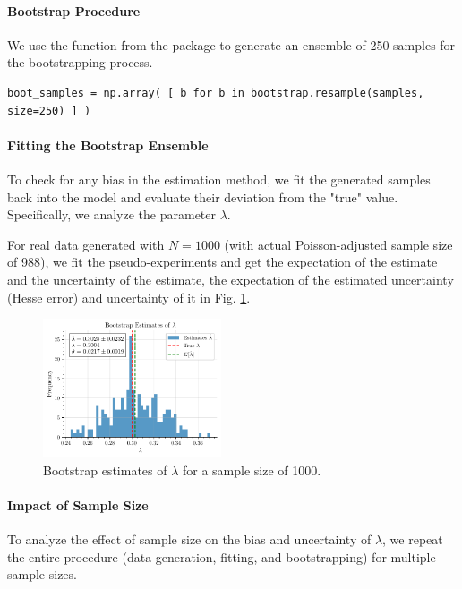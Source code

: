 \documentclass{article}
\begin{document}
\paragraph{Bootstrap Procedure}
We use the  function from the  package\cite{scikit-hep_resample} to generate an ensemble of 250 samples for the bootstrapping process.

\begin{lstlisting}[style=pythonstyle]
boot_samples = np.array( [ b for b in bootstrap.resample(samples, size=250) ] )
\end{lstlisting}

\paragraph{Fitting the Bootstrap Ensemble}
To check for any bias in the estimation method, we fit the generated samples back into the model and evaluate their deviation from the "true" value. Specifically, we analyze the parameter $\lambda$.

For real data generated with $N = 1000$ (with actual Poisson-adjusted sample size of 988), we fit the pseudo-experiments and get the expectation of the estimate and the uncertainty of the estimate, the expectation of the estimated uncertainty (Hesse error) and uncertainty of it in Fig. \ref{fig:samplingest_1000}. 

\begin{figure}[!htbp]
\centering
\includegraphics[width=0.47\textwidth]{./images/bootstrap_estimates.pdf}
\caption{Bootstrap estimates of $\lambda$ for a sample size of 1000.}
\label{fig:samplingest_1000}
\end{figure}

\paragraph{Impact of Sample Size}
To analyze the effect of sample size on the bias and uncertainty of $\lambda$, we repeat the entire procedure (data generation, fitting, and bootstrapping) for multiple sample sizes.
\end{document}
